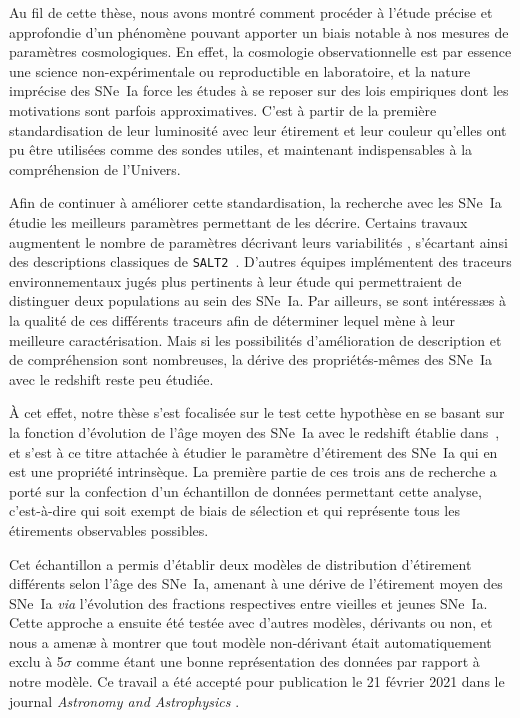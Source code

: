 \documentclass[../main/main.tex]{subfiles}
\begin{document}

Au fil de cette thèse, nous avons montré comment procéder à l'étude précise et
approfondie d'un phénomène pouvant apporter un biais notable à nos mesures de
paramètres cosmologiques. En effet, la cosmologie observationnelle est par
essence une science non-expérimentale ou reproductible en laboratoire, et la
nature imprécise des SNe~Ia force les études à se reposer sur des lois
empiriques dont les motivations sont parfois approximatives. C'est à partir de
la première standardisation de leur luminosité avec leur étirement et leur
couleur qu'elles ont pu être utilisées comme des sondes utiles, et maintenant
indispensables à la compréhension de l'Univers.

Afin de continuer à améliorer cette standardisation, la recherche avec les
SNe~Ia étudie les meilleurs paramètres permettant de les décrire. Certains
travaux augmentent le nombre de paramètres décrivant leurs variabilités
\citep[c'est le cas de SUGAR, décrit dans][]{leget2020}, s'écartant ainsi des
descriptions classiques de \texttt{SALT2}~\citep{guy2007}. D'autres équipes
implémentent des traceurs environnementaux jugés plus pertinents à leur étude
\citep[par exemple, le LsSFR ou la masse de la galaxie hôte
dans][respectivement]{rigault2013, childress2013} qui permettraient de
distinguer deux populations au sein des SNe~Ia. Par ailleurs, \cite{briday2022}
se sont intéressæs à la qualité de ces différents traceurs afin de déterminer
lequel mène à leur meilleure caractérisation. Mais si les possibilités
d'amélioration de description et de compréhension sont nombreuses, la dérive des
propriétés-mêmes des SNe~Ia avec le redshift reste peu étudiée.

À cet effet, notre thèse s'est focalisée sur le test cette hypothèse en se
basant sur la fonction d'évolution de l'âge moyen des SNe~Ia avec le redshift
établie dans~\cite{rigault2020}, et s'est à ce titre attachée à étudier le
paramètre d'étirement des SNe~Ia qui en est une propriété intrinsèque. La
première partie de ces trois ans de recherche a porté sur la confection d'un
échantillon de données permettant cette analyse, c'est-à-dire qui soit exempt de
biais de sélection et qui représente tous les étirements observables possibles.

Cet échantillon a permis d'établir deux modèles de distribution d'étirement
différents selon l'âge des SNe~Ia, amenant à une dérive de l'étirement moyen des
SNe~Ia \textit{via} l'évolution des fractions respectives entre vieilles et
jeunes SNe~Ia. Cette approche a ensuite été testée avec d'autres modèles,
dérivants ou non, et nous a amenæ à montrer que tout modèle non-dérivant était
automatiquement exclu à 5$\sigma$ comme étant une bonne représentation des
données par rapport à notre modèle. Ce travail a été accepté pour publication le
21 février 2021 dans le journal \textit{Astronomy and Astrophysics}
\citep{nicolas2021}.
\end{document}
